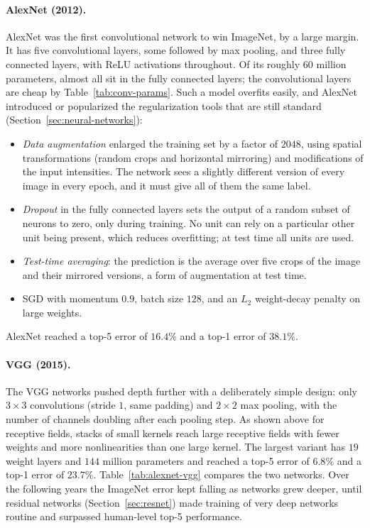 \paragraph{AlexNet (2012).}
AlexNet was the first convolutional network to win ImageNet, by a large margin.
It has five convolutional layers, some followed by max pooling, and three fully
connected layers, with ReLU activations throughout. Of its roughly $60$ million
parameters, almost all sit in the fully connected layers; the convolutional
layers are cheap by Table~\ref{tab:conv-params}. Such a model overfits easily,
and AlexNet introduced or popularized the regularization tools that are still
standard (Section~\ref{sec:neural-networks}):
\begin{itemize}
  \item \emph{Data augmentation} enlarged the training set by a factor of $2048$,
        using spatial transformations (random crops and horizontal mirroring)
        and modifications of the input intensities. The network sees a
        slightly different version of every image in every epoch, and it must
        give all of them the same label.
  \item \emph{Dropout} in the fully connected layers sets the output of a random
        subset of neurons to zero, only during training. No unit can rely on
        a particular other unit being present, which reduces overfitting; at test
        time all units are used.
  \item \emph{Test-time averaging}: the prediction is the average over five
        crops of the image and their mirrored versions, a form of augmentation
        at test time.
  \item SGD with momentum $0.9$, batch size $128$, and an $L_2$ weight-decay
        penalty on large weights.
\end{itemize}
\noindent
AlexNet reached a top-5 error of $16.4\%$ and a top-1 error of $38.1\%$.

\paragraph{VGG (2015).}
The VGG networks pushed depth further with a deliberately simple design: only
$3\times3$ convolutions (stride $1$, same padding) and $2\times2$ max pooling,
with the number of channels doubling after each pooling step. As shown above for
receptive fields, stacks of small kernels reach large receptive
fields with fewer weights and more nonlinearities than one large kernel. The
largest variant has $19$ weight layers and $144$ million parameters and reached
a top-5 error of $6.8\%$ and a top-1 error of $23.7\%$.
Table~\ref{tab:alexnet-vgg} compares the two networks. Over the following years
the ImageNet error kept falling as networks grew deeper, until residual
networks (Section~\ref{sec:resnet}) made training of very deep networks routine and
surpassed human-level top-5 performance.

